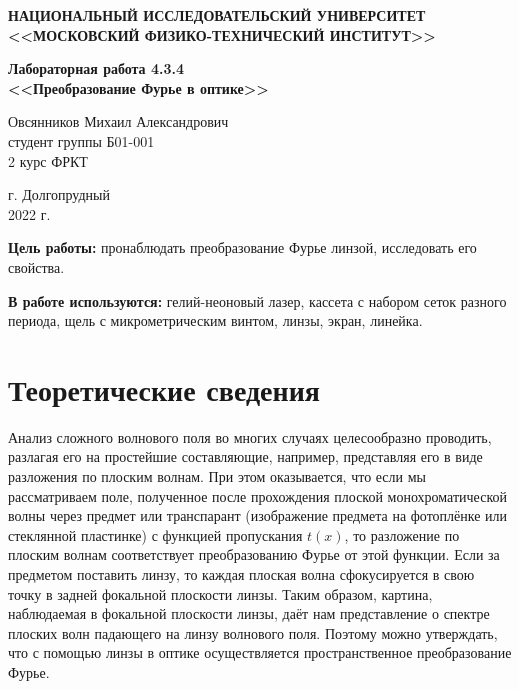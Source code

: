 \documentclass[a4paper,12pt]{article} %
\begin{document}
	
	
	\begin{center}
		
		
		\textbf{НАЦИОНАЛЬНЫЙ ИССЛЕДОВАТЕЛЬСКИЙ УНИВЕРСИТЕТ \\ <<МОСКОВСКИЙ ФИЗИКО-ТЕХНИЧЕСКИЙ ИНСТИТУТ>>}
		\vspace{13ex}
		
		\textbf{Лабораторная работа 4.3.4\\ <<Преобразование Фурье в оптике>>}
		\vspace{40ex}
		
		\normalsize{Овсянников Михаил Александрович \\ студент группы Б01-001\\ 2 курс ФРКТ\\}
	\end{center}
	
	\vfill 
	
	\begin{center}
		г. Долгопрудный\\ 
		2022 г.
	\end{center}
	
	
	\thispagestyle{empty} %
	\newpage
	
	\textbf{Цель работы:} пронаблюдать преобразование Фурье линзой, исследовать его свойства.
	
	\textbf{В работе используются:} гелий-неоновый лазер, кассета с набором сеток разного периода, щель с микрометрическим винтом, линзы, экран, линейка. 
	
	\section*{Теоретические сведения}
	Анализ сложного волнового поля во многих случаях целесообразно проводить, разлагая его на простейшие составляющие, например, представляя его в виде разложения по плоским волнам. При этом оказывается, что если мы рассматриваем поле, полученное после прохождения плоской монохроматической волны через предмет или транспарант (изображение предмета на фотоплёнке или стеклянной пластинке) с функцией пропускания $t(x)$, то разложение по плоским волнам соответствует преобразованию Фурье от этой функции. Если за предметом поставить линзу, то каждая плоская волна сфокусируется в свою точку в задней фокальной плоскости линзы. Таким образом, картина, наблюдаемая в фокальной плоскости линзы, даёт нам представление о спектре плоских волн падающего на линзу волнового поля. Поэтому можно утверждать, что с помощью линзы в оптике осуществляется пространственное преобразование Фурье.
	
\end{document}
